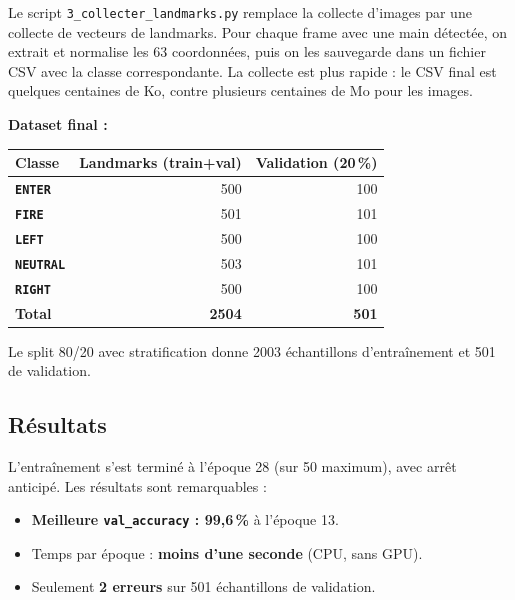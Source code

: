 \documentclass[12pt, a4paper]{article}
\newcommand{\code}[1]{\texttt{\small #1}}
\newcommand{\cls}[1]{\textbf{\texttt{#1}}}
\begin{document}
Le script \code{3\_collecter\_landmarks.py} remplace la collecte d'images par
une collecte de vecteurs de landmarks. Pour chaque frame avec une main détectée,
on extrait et normalise les 63 coordonnées, puis on les sauvegarde dans un fichier
CSV avec la classe correspondante. La collecte est plus rapide : le CSV final
est quelques centaines de Ko, contre plusieurs centaines de Mo pour les images.

\textbf{Dataset final :}

\begin{center}
\begin{tabular}{@{}lrr@{}}
  \toprule
  \textbf{Classe} & \textbf{Landmarks (train+val)} & \textbf{Validation (20\,\%)} \\
  \midrule
  \cls{ENTER}   & 500 & 100 \\
  \cls{FIRE}    & 501 & 101 \\
  \cls{LEFT}    & 500 & 100 \\
  \cls{NEUTRAL} & 503 & 101 \\
  \cls{RIGHT}   & 500 & 100 \\
  \midrule
  \textbf{Total} & \textbf{2504} & \textbf{501} \\
  \bottomrule
\end{tabular}
\end{center}

Le split 80/20 avec stratification donne 2003 échantillons d'entraînement et
501 de validation.

\subsection{Résultats}

L'entraînement s'est terminé à l'époque 28 (sur 50 maximum), avec arrêt
anticipé. Les résultats sont remarquables :

\begin{itemize}
  \item \textbf{Meilleure \code{val\_accuracy} : 99,6\,\%} à l'époque 13.
  \item Temps par époque : \textbf{moins d'une seconde} (CPU, sans GPU).
  \item Seulement \textbf{2 erreurs} sur 501 échantillons de validation.
\end{itemize}
\end{document}
